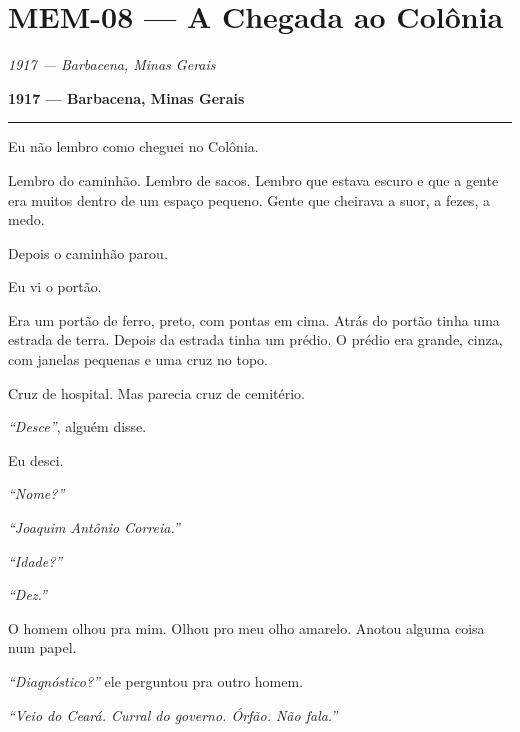\section*{\textbf{MEM-08} --- A Chegada ao Colônia}

\noindent \textit{1917 --- Barbacena, Minas Gerais}

\noindent \textbf{1917 --- Barbacena, Minas Gerais}

\vspace{0.5em}\noindent\rule{\textwidth}{0.5pt}\vspace{0.5em}

\noindent Eu não lembro como cheguei no Colônia.

\noindent Lembro do caminhão. Lembro de sacos. Lembro que estava escuro e que a gente era muitos dentro de um espaço pequeno. Gente que cheirava a suor, a fezes, a medo.

\noindent Depois o caminhão parou.

\noindent Eu vi o portão.

\noindent Era um portão de ferro, preto, com pontas em cima. Atrás do portão tinha uma estrada de terra. Depois da estrada tinha um prédio. O prédio era grande, cinza, com janelas pequenas e uma cruz no topo.

\noindent Cruz de hospital. Mas parecia cruz de cemitério.

\noindent \textit{\textquotedblleft{}Desce\textquotedblright{}}, alguém disse.

\noindent Eu desci.

\noindent \textit{\textquotedblleft{}Nome?\textquotedblright{}}

\noindent \textit{\textquotedblleft{}Joaquim Antônio Correia.\textquotedblright{}}

\noindent \textit{\textquotedblleft{}Idade?\textquotedblright{}}

\noindent \textit{\textquotedblleft{}Dez.\textquotedblright{}}

\noindent O homem olhou pra mim. Olhou pro meu olho amarelo. Anotou alguma coisa num papel.

\noindent \textit{\textquotedblleft{}Diagnóstico?\textquotedblright{}} ele perguntou pra outro homem.

\noindent \textit{\textquotedblleft{}Veio do Ceará. Curral do governo. Órfão. Não fala.\textquotedblright{}}

